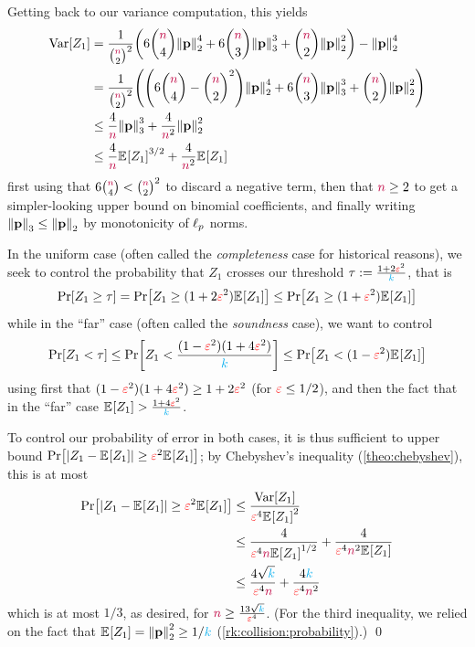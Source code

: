 Getting back to our variance computation, this yields
\begin{align}
  \Var[Z_1] 
   &= \frac{1}{\binom{\ns}{2}^2} \Paren{ 6\binom{\ns}{4}\normtwo{\p}^4+6\binom{\ns}{3}\norm{\p}_3^3+\binom{\ns}{2}\normtwo{\p}^2 } - \normtwo{\p}^4 \notag\\
   &= \frac{1}{\binom{\ns}{2}^2} \Paren{ \Paren{6\binom{\ns}{4} - \binom{\ns}{2}^2}\normtwo{\p}^4+6\binom{\ns}{3}\norm{\p}_3^3+\binom{\ns}{2}\normtwo{\p}^2 } \label{eq:collisionbased:loose}\\
   &\leq \frac{4}{\ns}\norm{\p}_3^3+\frac{4}{\ns^2}\normtwo{\p}^2 \notag\\
   &\leq \frac{4}{\ns}\bEE{Z_1}^{3/2}+\frac{4}{\ns^2}\bEE{Z_1}  \notag
\end{align}
first using that $6\binom{\ns}{4} < \binom{\ns}{2}^2$ to discard a negative term, then that $\ns \geq 2$ to get a simpler-looking upper bound on binomial coefficients, and finally writing $\norm{\p}_3 \leq \normtwo{\p}$ by monotonicity of $\lp[p]$ norms.

In the uniform case (often called the \emph{completeness} case for historical reasons), we seek to control the probability that $Z_1$ crosses our threshold $\tau \eqdef \frac{1+2\dst^2}{\ab}$, that is
\[
    \bPr{Z_1 \geq \tau} = \bPr{Z_1 \geq (1+2\dst^2)\bEE{Z_1}} \leq \bPr{Z_1 \geq (1+\dst^2)\bEE{Z_1}}
\]
while in the ``far'' case (often called the \emph{soundness} case), we want to control
\[
    \bPr{Z_1 < \tau} \leq \bPr{Z_1 < \frac{(1-\dst^2)(1+4\dst^2)}{\ab}} \leq \bPr{Z_1 < (1-\dst^2)\bEE{Z_1}}
\]
using first that $(1-\dst^2)(1+4\dst^2) \geq 1+2\dst^2$ (for $\dst\leq 1/2$), and then the fact that in the ``far'' case $\bEE{Z_1} > \frac{1+4\dst^2}{\ab}$.

To control our probability of error in both cases, it is thus sufficient to upper bound $\bPr{\abs{Z_1-\bEE{Z_1}} \geq \dst^2\bEE{Z_1}}$; by Chebyshev's inequality (\cref{theo:chebyshev}), this is at most
\begin{align*}
    \bPr{\abs{Z_1-\bEE{Z_1}} \geq \dst^2\bEE{Z_1}}
    &\leq \frac{\Var[Z_1] }{\dst^4\bEE{Z_1}^2} \\
    &\leq \frac{4}{\dst^4\ns\bEE{Z_1}^{1/2}}+\frac{4}{\dst^4\ns^2\bEE{Z_1}} \\
    &\leq \frac{4\sqrt{\ab}}{\dst^4\ns}+\frac{4\ab}{\dst^4\ns^2}
\end{align*}
which is at most $1/3$, as desired, for $\ns \geq \frac{13\sqrt{\ab}}{\dst^4}$. (For the third inequality, we relied on the fact that $\bEE{Z_1} = \normtwo{\p}^2 \geq 1/\ab$ (\cf \cref{rk:collision:probability}).) \qed\medskip

